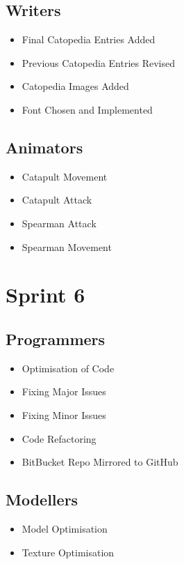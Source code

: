 \documentclass{article}
\begin{document}
\subsection{Writers}
\begin{itemize}
    \item Final Catopedia Entries Added
    \item Previous Catopedia Entries Revised
    \item Catopedia Images Added
    \item Font Chosen and Implemented
\end{itemize}

\subsection{Animators}
\begin{itemize}
    \item Catapult Movement
    \item Catapult Attack
    \item Spearman Attack
    \item Spearman Movement
\end{itemize}

\newpage
\section{Sprint 6}
\subsection{Programmers}
\begin{itemize}
    \item Optimisation of Code
    \item Fixing Major Issues
    \item Fixing Minor Issues
    \item Code Refactoring
    \item BitBucket Repo Mirrored to GitHub
\end{itemize}

\subsection{Modellers}
\begin{itemize}
    \item Model Optimisation
    \item Texture Optimisation
\end{itemize}
\end{document}
